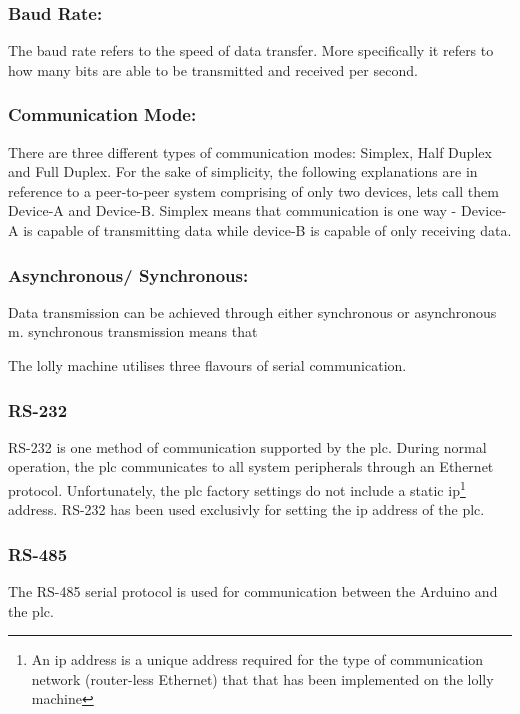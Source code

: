     \subsubsection{Baud Rate:}The baud rate refers to the speed of data transfer. More specifically it refers to how many bits are able to be transmitted and received per second. 
    
    \subsubsection{Communication Mode:}There are three different types of communication modes: Simplex, Half Duplex and Full Duplex. For the sake of simplicity, the following explanations are in reference to a peer-to-peer system comprising of only two devices, lets call them Device-A and Device-B. Simplex means that communication is one way - Device-A is capable of transmitting data while device-B is capable of only receiving data.
    
    \subsubsection{Asynchronous/ Synchronous:}Data transmission can be achieved through either synchronous or asynchronous m. synchronous transmission means that 
    
    The lolly machine utilises three flavours of serial communication.
    
    \subsubsection{RS-232}
    RS-232 is one method of communication supported by the \acrshort{plc}. During normal operation, the \acrshort{plc} communicates to all system peripherals through an Ethernet protocol. Unfortunately, the \acrshort{plc} factory settings do not include a static \acrshort{ip}\footnote{An \acrshort{ip} address is a unique address required for the type of communication network (router-less Ethernet) that that has been implemented on the lolly machine} address.  RS-232 has been used exclusivly for setting the \acrshort{ip} address of the \acrshort{plc}.
    
    \subsubsection{RS-485}
    The RS-485 serial protocol is used for communication between the Arduino and the \acrshort{plc}.
    
